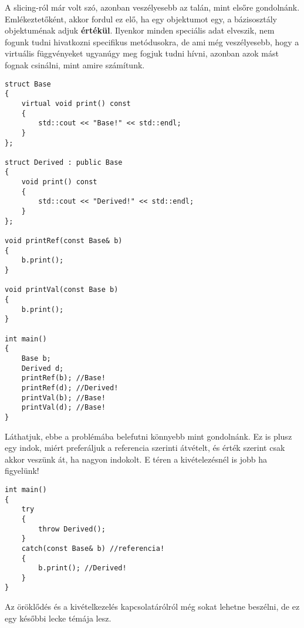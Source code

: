\documentclass[a4paper,11.5pt,table]{article}
\begin{document}
	A slicing-ról már volt szó, azonban veszélyesebb az talán, mint elsőre gondolnánk. Emlékeztetőként, akkor fordul ez elő, ha egy objektumot egy, a bázisosztály objektuménak adjuk \textbf{értékül}. Ilyenkor minden speciális adat elveszik, nem fogunk tudni hivatkozni specifikus metódusokra, de ami még veszélyesebb, hogy a virtuális függvényeket ugyanúgy meg fogjuk tudni hívni, azonban azok mást fognak csinálni, mint amire számítunk.
	\begin{lstlisting}
struct Base
{
	virtual void print() const
	{
		std::cout << "Base!" << std::endl;
	}	
};

struct Derived : public Base
{
	void print() const
	{
		std::cout << "Derived!" << std::endl;
	}	
};

void printRef(const Base& b)
{
	b.print();
}

void printVal(const Base b)
{
	b.print();
}

int main()
{
	Base b;
	Derived d;
	printRef(b); //Base!
	printRef(d); //Derived!
	printVal(b); //Base!
	printVal(d); //Base!
}
	\end{lstlisting}
	Láthatjuk, ebbe a problémába belefutni könnyebb mint gondolnánk. Ez is plusz egy indok, miért preferáljuk a referencia szerinti átvételt, és érték szerint csak akkor veszünk át, ha nagyon indokolt. E téren a kivételezésnél is jobb ha figyelünk!
	\begin{lstlisting}
int main()
{
	try
	{
		throw Derived();
	}
	catch(const Base& b) //referencia!
	{
		b.print(); //Derived!
	}
}
	\end{lstlisting}
	Az öröklődés és a kivételkezelés kapcsolatárólról még sokat lehetne beszélni, de ez egy későbbi lecke témája lesz.
\end{document}
